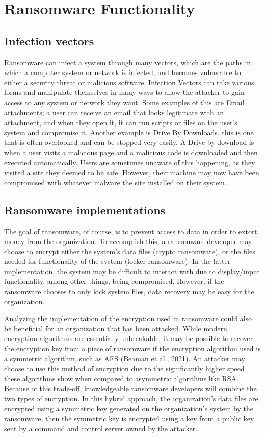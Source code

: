 \documentclass[11pt]{article}
\begin{document}
\section{Ransomware Functionality}
\label{sec:org8044e0e}
\subsection{Infection vectors}
\label{sec:org140f8ae}
Ransomware can infect a system through many vectors, which are the paths in which a computer system or network is infected, and becomes vulnerable to either a security threat or malicious software. Infection Vectors can take various forms and manipulate themselves in many ways to allow the attacker to gain access to any system or network they want. Some examples of this are Email attachments; a user can receive an email that looks legitimate with an attachment, and when they open it, it can run scripts or files on the user's system and compromise it. Another example is Drive By Downloads. this is one that is often overlooked and can be stopped very easily. A Drive by download is when a user visits a malicious page and a malicious code is downloaded and then executed automatically. Users are sometimes unaware of this happening, as they visited a site they deemed to be safe. However, their machine may now have been compromised with whatever malware the site installed on their system.

\subsection{Ransomware implementations}
\label{sec:orgd9b13a7}
The goal of ransomware, of course, is to prevent access to data in order to extort money from the organization. To accomplish this, a ransomware developer may choose to encrypt either the system's data files (crypto ransomware), or the files needed for functionality of the system (locker ransomware). In the latter implementation, the system may be difficult to interact with due to display/input functionality, among other things, being compromised. However, if the ransomware chooses to only lock system files, data recovery may be easy for the organization.

Analyzing the implementation of the encryption used in ransomware could also be beneficial for an organization that has been attacked. While modern encryption algorithms are essentially unbreakable, it may be possible to recover the encryption key from a piece of ransomware if the encryption algorithm used is a symmetric algorithm, such as AES (Beaman et al., 2021). An attacker may choose to use this method of encryption due to the significantly higher speed these algorithms show when compared to asymmetric algorithms like RSA. Because of this trade-off, knowledgeable ransomware developers will combine the two types of encryption. In this hybrid approach, the organization's data files are encrypted using a symmetric key generated on the organization's system by the ransomware, then the symmetric key is encrypted using a key from a public key sent by a command and control server owned by the attacker.
\end{document}
